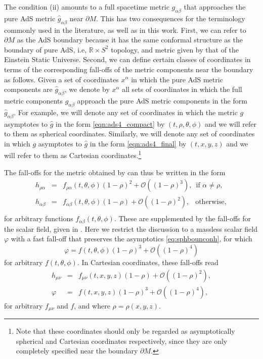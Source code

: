 \documentclass[aps,letterpaper,twocolumn,nofootinbib]{revtex4}
\numberwithin{equation}{section}
\begin{document}
The condition (ii) amounts to a full spacetime metric $g_{\alpha\beta}$ that approaches the pure AdS metric $\hat{g}_{\alpha\beta}$ near $\partial M$.
This has two consequences for the terminology commonly used in the literature, as well as in this work.
First, we can refer to $\partial M$ as the AdS boundary because it has the same conformal structure as the boundary of pure AdS, i.e, $\mathbb{R}\times S^2$ topology, and metric given by that of the Einstein Static Universe. 
Second, we can define certain classes of coordinates in terms of the corresponding fall-offs of the metric components near the boundary as follows.
Given a set of coordinates $x^\alpha$ in which the pure AdS metric components are $\hat{g}_{\alpha\beta}$, we denote by $x^\alpha$ all sets of coordinates in which the full metric components $g_{\alpha\beta}$ approach the pure AdS metric components in the form $\hat{g}_{\alpha\beta}$. For example, we will denote any set of coordinates in which the metric $g$ asymptotes to $\hat{g}$ in the form \eqref{eqn:ads4_compact} by $(t,\rho,\theta,\phi)$ and we will refer to them as spherical coordinates. Similarly, we will denote any set of coordinates in which $g$ asymptotes to $\hat{g}$ in the form \eqref{eqn:ads4_final} by $(t,x,y,z)$ and we will refer to them as Cartesian coordinates.\footnote{Note that these coordinates should only be regarded as asymptotically spherical and Cartesian coordinates respectively, since they are only completely specified near the boundary $\partial M$.}

The fall-offs for the metric obtained by \cite{Henneaux:1985tv} can thus be written in the form
\begin{eqnarray}
\label{eq:sphbounconh}
h_{\rho\alpha}&=&f_{\rho\alpha}(t,\theta,\phi)(1-\rho)^2+\mathcal{O}((1-\rho)^3), \, \textrm{ if $\alpha\neq\rho$}, \nonumber \\ 
h_{\alpha\beta}&=&f_{\alpha\beta}(t,\theta,\phi)(1-\rho)+\mathcal{O}((1-\rho)^{2}), \, \; \textrm{ otherwise}, \nonumber \\
\end{eqnarray}
for arbitrary functions $f_{\alpha\beta}(t,\theta,\phi)$. 
These are supplemented by the fall-offs for the scalar field, given in \cite{Henneaux:2006hk}.
Here we restrict the discussion to a massless scalar field $\varphi$ with a fast fall-off that preserves the asymptotics \eqref{eq:sphbounconh}, for which
\begin{equation}\label{eq:sphbounconphi}
\varphi=f(t,\theta,\phi)(1-\rho)^3+\mathcal{O}((1-\rho)^4)
\end{equation}
for arbitrary $f(t,\theta,\phi)$. In Cartesian coordinates, these fall-offs read
\begin{eqnarray}
\label{eq:carbouncondh}
h_{\mu\nu}&=&f_{\mu\nu}(t,x,y,z)(1-\rho)+\mathcal{O}((1-\rho)^{2}), \\
\label{eq:carbouncondphi}
\varphi&=&f(t,x,y,z)(1-\rho)^3+\mathcal{O}((1-\rho)^{4}), 
\end{eqnarray}
for arbitrary $f_{\mu\nu}$ and $f$, and where $\rho = \rho(x,y,z)$.
\end{document}
